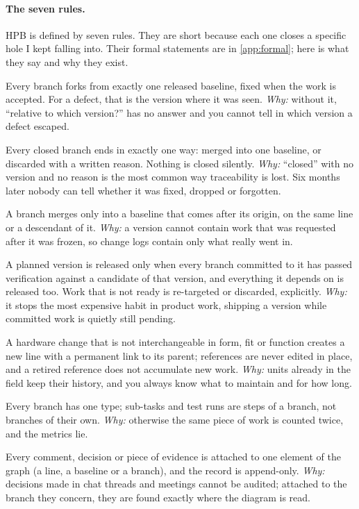 \paragraph{The seven rules.}
HPB is defined by seven rules. They are short because each one closes a
specific hole I kept falling into. Their formal statements are in
\cref{app:formal}; here is what they say and why they exist.
\begin{description}[leftmargin=1.2em,style=nextline,itemsep=3pt,topsep=4pt]
  \item[\Cref{rule:origin}: single origin.]
    Every branch forks from exactly one released baseline, fixed when the
    work is accepted. For a defect, that is the version where it was seen.
    \emph{Why:} without it, ``relative to which version?'' has no answer
    and you cannot tell in which version a defect escaped.
  \item[\Cref{rule:closure}: explicit closure.]
    Every closed branch ends in exactly one way: merged into one baseline,
    or discarded with a written reason. Nothing is closed silently.
    \emph{Why:} ``closed'' with no version and no reason is the most common
    way traceability is lost. Six months later nobody can tell whether it
    was fixed, dropped or forgotten.
  \item[\Cref{rule:time}: time moves forward.]
    A branch merges only into a baseline that comes after its origin, on
    the same line or a descendant of it. \emph{Why:} a version cannot
    contain work that was requested after it was frozen, so change logs
    contain only what really went in.
  \item[\Cref{rule:gate}: gate integrity.]
    A planned version is released only when every branch committed to it
    has passed verification against a candidate of that version, and
    everything it depends on is released too. Work that is not ready is
    re-targeted or discarded, explicitly. \emph{Why:} it stops the most
    expensive habit in product work, shipping a version while committed
    work is quietly still pending.
  \item[\Cref{rule:lineage}: lineage and life cycle.]
    A hardware change that is not interchangeable in form, fit or function
    creates a new line with a permanent link to its parent; references are
    never edited in place, and a retired reference does not accumulate new
    work. \emph{Why:} units already in the field keep their history, and
    you always know what to maintain and for how long.
  \item[\Cref{rule:typed}: typed work.]
    Every branch has one type; sub-tasks and test runs are steps of a
    branch, not branches of their own. \emph{Why:} otherwise the same piece
    of work is counted twice, and the metrics lie.
  \item[\Cref{rule:discussion}: traceable discussion.]
    Every comment, decision or piece of evidence is attached to one
    element of the graph (a line, a baseline or a branch), and the record
    is append-only. \emph{Why:} decisions made in chat threads and meetings
    cannot be audited; attached to the branch they concern, they are found
    exactly where the diagram is read.
\end{description}

